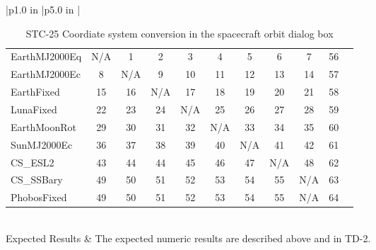 \begin{table}[htbp!]
\begin{tabular}{|p{1.0 in} |p{5.0 in} |}
\begin{centering}
\begin{tabular}{|l|c|c|c|c|c|c|c|c|c|c|}
             \rotatebox{90}{ CS\_SSBary  } &
             \rotatebox{90}{ PhobosFixed  }   \\ \hline
             EarthMJ2000Eq & N/A & 1 & 2 & 3 & 4 & 5 & 6 & 7 & 56\\ \hline
             EarthMJ2000Ec & 8 & N/A & 9 & 10 & 11 & 12 & 13 & 14 & 57\\ \hline
             EarthFixed & 15 & 16 & N/A & 17 & 18 & 19 & 20 & 21 & 58\\ \hline
             LunaFixed & 22 & 23 & 24 & N/A & 25 & 26 & 27 & 28 & 59\\ \hline
             EarthMoonRot & 29 & 30 & 31 & 32 & N/A & 33 & 34 & 35 & 60\\ \hline
             SunMJ2000Ec & 36 & 37 & 38 & 39 & 40 &  N/A & 41 & 42 & 61\\ \hline
             CS\_ESL2 & 43 & 44 & 44 & 45 & 46 & 47 & N/A & 48 & 62\\ \hline
             CS\_SSBary & 49 & 50 & 51 & 52 & 53 & 54 & 55 & N/A & 63\\ \hline
             PhobosFixed & 49 & 50 & 51 & 52 & 53 & 54 & 55 & N/A & 64\\ \hline
          \end{tabular}
          \end{centering} \vspace{0.1 in}\\
         \hline
         Expected Results & The expected numeric results are described above and in TD-2.\\
      \hline
\end{tabular}
   \label{Table:STC-25}
   \caption{STC-25 Coordiate system conversion in the spacecraft orbit dialog box}
\end{table} 